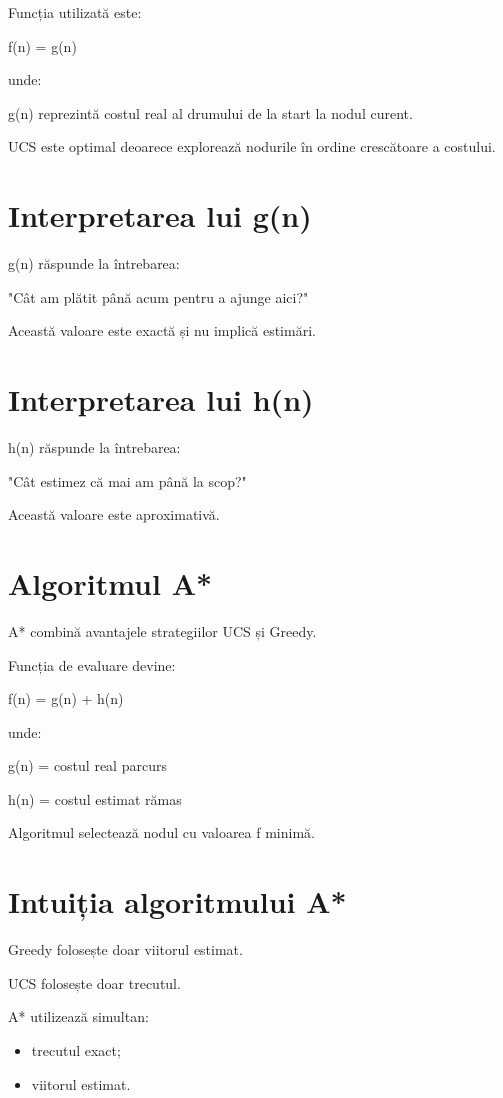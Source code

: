 \documentclass[12pt,a4paper]{article}
\begin{document}
Funcția utilizată este:

f(n) = g(n)

unde:

g(n) reprezintă costul real al drumului de la start la nodul curent.

UCS este optimal deoarece explorează nodurile în ordine crescătoare a costului.

\section{Interpretarea lui g(n)}

g(n) răspunde la întrebarea:

"Cât am plătit până acum pentru a ajunge aici?"

Această valoare este exactă și nu implică estimări.

\section{Interpretarea lui h(n)}

h(n) răspunde la întrebarea:

"Cât estimez că mai am până la scop?"

Această valoare este aproximativă.

\section{Algoritmul A*}

A* combină avantajele strategiilor UCS și Greedy.

Funcția de evaluare devine:

f(n) = g(n) + h(n)

unde:

g(n) = costul real parcurs

h(n) = costul estimat rămas

Algoritmul selectează nodul cu valoarea f minimă.

\section{Intuiția algoritmului A*}

Greedy folosește doar viitorul estimat.

UCS folosește doar trecutul.

A* utilizează simultan:

\begin{itemize}
\item trecutul exact;
\item viitorul estimat.
\end{itemize}
\end{document}
